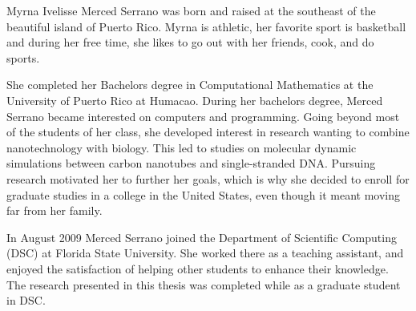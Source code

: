 \documentclass[11pt]{fsuthesis}
\begin{document}
\begin{biosketch}
Myrna Ivelisse Merced Serrano was born and raised at the southeast of the beautiful island of Puerto Rico. Myrna is athletic, her favorite sport is basketball and during her free time, she likes to go out with her friends, cook, and do sports. 

She completed her Bachelors degree in Computational Mathematics at the University of Puerto Rico at Humacao. During her bachelors degree, Merced Serrano became interested on computers and programming. Going beyond most of the students of her class, she developed interest in research wanting to combine nanotechnology with biology. This led to studies on molecular dynamic simulations between carbon nanotubes and single-stranded DNA. Pursuing research motivated her to further her goals, which is why she decided to enroll for graduate studies in a college in the United States, even though it meant moving far from her family.

In August 2009 Merced Serrano joined the Department of Scientific Computing (DSC) at Florida State University. She worked there as a teaching assistant, and enjoyed the satisfaction of helping other students to enhance their knowledge. The research presented in this thesis was completed while as a graduate student in DSC.
\end{biosketch}
\end{document}
